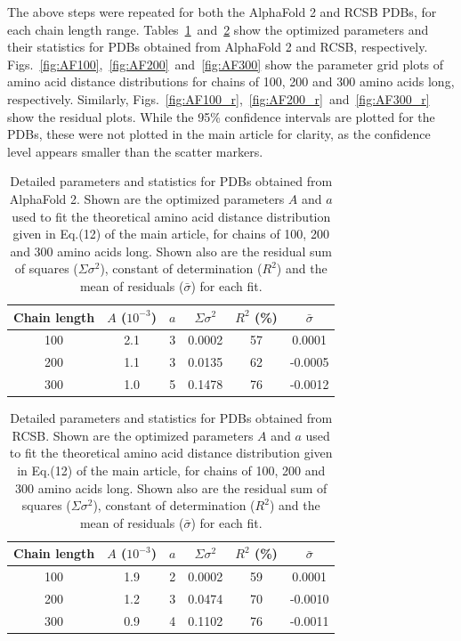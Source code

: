 \documentclass[notitlepage,
reprint,%
onecolumn,
amsmath,amssymb,superscriptaddress,aps,
pre]{revtex4-1}
\begin{document}
The above steps were repeated for both the AlphaFold 2 and RCSB PDBs, for each chain length range. Tables~\ref{table:af}~and~\ref{table:rcsb} show the optimized parameters and their statistics for PDBs obtained from AlphaFold 2 and RCSB, respectively. Figs.~\ref{fig:AF100},~\ref{fig:AF200}~and~\ref{fig:AF300} show the parameter grid plots of amino acid distance distributions for chains of 100, 200 and 300 amino acids long, respectively. Similarly, Figs.~\ref{fig:AF100_r},~\ref{fig:AF200_r}~and~\ref{fig:AF300_r} show the residual plots. While the 95\% confidence intervals are plotted for the PDBs, these were not plotted in the main article for clarity, as the confidence level appears smaller than the scatter markers. 

\begin{table}[tb]
\centering
\begin{tabular}{|c c c c c c|}
\hline
Chain length  & $A$ ($10^{-3}$) & $a$ & $\Sigma \sigma^{2}$ & $R^2$ (\%) & $\bar{\sigma}$ \\
\hline
100 & 2.1 & 3 & 0.0002 & 57 & 0.0001 \\
200 & 1.1 & 3 & 0.0135 & 62 & -0.0005 \\
300 &1.0 & 5 & 0.1478 & 76  & -0.0012 \\
\hline
\end{tabular}
 \caption{Detailed parameters and statistics for PDBs obtained from AlphaFold 2. Shown are the optimized parameters $A$ and $a$ used to fit the theoretical amino acid distance distribution given in Eq.(12) of the main article, for chains of 100, 200 and 300 amino acids long.  Shown also are the residual sum of squares ($\Sigma \sigma^{2}$), constant of determination ($R^2$) and the mean of residuals ($\bar{\sigma}$) for each fit.}
\label{table:af}
\end{table}

\begin{table}[h]
\centering
\begin{tabular}{|c c c c c c|}
\hline
Chain length & $A$ ($10^{-3}$) & $a$ & $\Sigma \sigma^{2}$ & $R^2$ (\%) & $\bar{\sigma}$ \\
\hline
100 & 1.9 & 2 & 0.0002 & 59 & 0.0001 \\
200 & 1.2 & 3 & 0.0474 & 70 & -0.0010\\
300 & 0.9 & 4 & 0.1102 & 76 & -0.0011\\
\hline
\end{tabular}
 \caption{Detailed parameters and statistics for PDBs obtained from RCSB. Shown are the optimized parameters $A$ and $a$ used to fit the theoretical amino acid distance distribution given in Eq.(12) of the main article, for chains of 100, 200 and 300 amino acids long. Shown also are the residual sum of squares ($\Sigma \sigma^{2}$), constant of determination ($R^2$) and the mean of residuals ($\bar{\sigma}$) for each fit.}
\label{table:rcsb}
\end{table}
\end{document}
